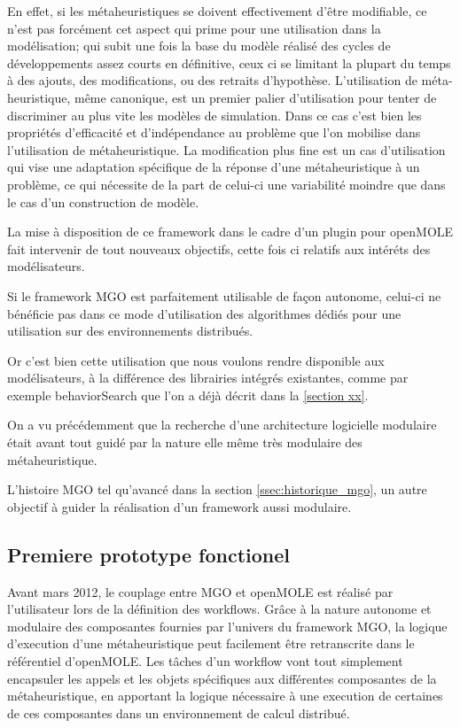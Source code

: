 En effet, si les métaheuristiques se doivent effectivement d'être modifiable, ce n'est pas forcément cet aspect qui prime pour une utilisation dans la modélisation; qui subit une fois la base du modèle réalisé des cycles de développements assez courts en définitive, ceux ci se limitant la plupart du temps à des ajouts, des modifications, ou des retraits d'hypothèse. L'utilisation de méta-heuristique, même canonique, est un premier palier d'utilisation pour tenter de discriminer au plus vite les modèles de simulation. Dans ce cas c'est bien les propriétés d'efficacité et d'indépendance au problème que l'on mobilise dans l'utilisation de métaheuristique. La modification plus fine est un cas d'utilisation qui vise une adaptation spécifique de la réponse d'une métaheuristique à un problème, ce qui nécessite de la part de celui-ci une variabilité moindre que dans le cas d'un construction de modèle.


La mise à disposition de ce framework dans le cadre d'un plugin pour openMOLE fait intervenir de tout nouveaux objectifs, cette fois ci relatifs aux intéréts des modélisateurs.

Si le framework MGO est parfaitement utilisable de façon autonome, celui-ci ne bénéficie pas dans ce mode d'utilisation des algorithmes dédiés pour une utilisation sur des environnements distribués.

Or c'est bien cette utilisation que nous voulons rendre disponible aux modélisateurs, à la différence des librairies intégrés existantes, comme par exemple behaviorSearch que l'on a déjà décrit dans la \ref{section xx}.

On a vu précédemment que la recherche d'une architecture logicielle modulaire était avant tout guidé par la nature elle même très modulaire des métaheuristique. 



L'histoire MGO tel qu'avancé dans la section \ref{ssec:historique_mgo}, un autre objectif à guider la réalisation d'un framework aussi modulaire. 


\subsection{Premiere prototype fonctionel}
\label{p:prototype_fonctionel}

Avant mars 2012, le couplage entre MGO et openMOLE est réalisé par l'utilisateur lors de la définition des workflows. Grâce à la nature autonome et modulaire des composantes fournies par l'univers du framework MGO, la logique d'execution d'une métaheuristique peut facilement être retranscrite dans le référentiel d'openMOLE. Les tâches d'un workflow vont tout simplement encapsuler les appels et les objets spécifiques aux différentes composantes de la métaheuristique, en apportant la logique nécessaire à une execution de certaines de ces composantes dans un environnement de calcul distribué. 

